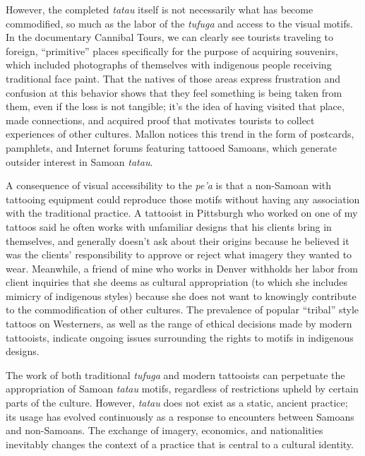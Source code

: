 However, the completed \textit{tatau} itself is not necessarily what has become
commodified, so much as the labor of the \textit{tufuga} and access to the
visual motifs. In the documentary Cannibal Tours, we can clearly see tourists
traveling to foreign, ``primitive'' places specifically for the purpose of
acquiring souvenirs, which included photographs of themselves with indigenous
people receiving traditional face paint. That the natives of those areas express
frustration and confusion at this behavior shows that they feel something is
being taken from them, even if the loss is not tangible; it's the idea of having
visited that place, made connections, and acquired proof that motivates tourists
to collect experiences of other cultures. Mallon notices this trend in the form
of postcards, pamphlets, and Internet forums featuring tattooed Samoans, which
generate outsider interest in Samoan \textit{tatau}.

A consequence of visual accessibility to the \textit{pe'a} is that a non-Samoan
with tattooing equipment could reproduce those motifs without having any
association with the traditional practice. A tattooist in Pittsburgh who worked
on one of my tattoos said he often works with unfamiliar designs that his
clients bring in themselves, and generally doesn't ask about their origins
because he believed it was the clients' responsibility to approve or reject what
imagery they wanted to wear. Meanwhile, a friend of mine who works in Denver
withholds her labor from client inquiries that she deems as cultural
appropriation (to which she includes mimicry of indigenous styles) because she
does not want to knowingly contribute to the commodification of other cultures.
The prevalence of popular ``tribal'' style tattoos on Westerners, as well as the
range of ethical decisions made by modern tattooists, indicate ongoing issues
surrounding the rights to motifs in indigenous designs.

The work of both traditional \textit{tufuga} and modern tattooists can
perpetuate the appropriation of Samoan \textit{tatau} motifs, regardless of
restrictions upheld by certain parts of the culture. However, \textit{tatau}
does not exist as a static, ancient practice; its usage has evolved continuously
as a response to encounters between Samoans and non-Samoans. The exchange of
imagery, economics, and nationalities inevitably changes the context of a
practice that is central to a cultural identity.

